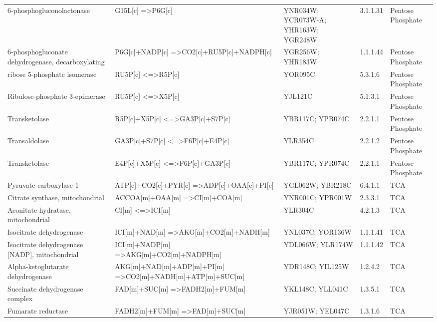 {\begin{landscape}
\begin{longtable}{p{.20\linewidth} | p{.25\linewidth} | p{.19\linewidth} | p{.05\linewidth} | p{.10\linewidth}}
6-phosphogluconolactonase & G15L{[}c{]} =\textgreater P6G{[}c{]}  & YNR034W; YCR073W-A; YHR163W; YGR248W  & 3.1.1.31 & Pentose Phosphate \\
6-phosphogluconate dehydrogenase, decarboxylating  & P6G{[}c{]}+NADP{[}c{]} =\textgreater CO2{[}c{]}+RU5P{[}c{]}+NADPH{[}c{]} & YGR256W; YHR183W & 1.1.1.44 & Pentose Phosphate \\
ribose 5-phosphate isomerase  & RU5P{[}c{]} \textless{}=\textgreater R5P{[}c{]} & YOR095C & 5.3.1.6  & Pentose Phosphate \\
Ribulose-phosphate 3-epimerase  & RU5P{[}c{]} \textless{}=\textgreater X5P{[}c{]} & YJL121C & 5.1.3.1  & Pentose Phosphate \\
Transketolase  & R5P{[}c{]}+X5P{[}c{]} \textless{}=\textgreater GA3P{[}c{]}+S7P{[}c{]}  & YBR117C; YPR074C & 2.2.1.1  & Pentose Phosphate \\
Transaldolase  & GA3P{[}c{]}+S7P{[}c{]} \textless{}=\textgreater F6P{[}c{]}+E4P{[}c{]}  & YLR354C & 2.2.1.2  & Pentose Phosphate \\
Transketolase  & E4P{[}c{]}+X5P{[}c{]} \textless{}=\textgreater F6P{[}c{]}+GA3P{[}c{]}  & YBR117C; YPR074C & 2.2.1.1  & Pentose Phosphate \\
Pyruvate carboxylase 1 & ATP{[}c{]}+CO2{[}c{]}+PYR{[}c{]} =\textgreater ADP{[}c{]}+OAA{[}c{]}+PI{[}c{]}  & YGL062W; YBR218C & 6.4.1.1  & TCA  \\
Citrate synthase, mitochondrial & ACCOA{[}m{]}+OAA{[}m{]} =\textgreater CI{[}m{]}+COA{[}m{]} & YNR001C; YPR001W & 2.3.3.1  & TCA  \\
Aconitate hydratase, mitochondrial  & CI{[}m{]} \textless{}=\textgreater ICI{[}m{]} & YLR304C & 4.2.1.3  & TCA  \\
Isocitrate dehydrogenase & ICI{[}m{]}+NAD{[}m{]} =\textgreater AKG{[}m{]}+CO2{[}m{]}+NADH{[}m{]}  & YNL037C; YOR136W & 1.1.1.41 & TCA  \\
Isocitrate dehydrogenase {[}NADP{]}, mitochondrial & ICI{[}m{]}+NADP{[}m{]} =\textgreater AKG{[}m{]}+CO2{[}m{]}+NADPH{[}m{]}  & YDL066W; YLR174W & 1.1.1.42 & TCA  \\
Alpha-ketoglutarate dehydrogenase & AKG{[}m{]}+NAD{[}m{]}+ADP{[}m{]}+PI{[}m{]} =\textgreater CO2{[}m{]}+NADH{[}m{]}+ATP{[}m{]}+SUC{[}m{]}  & YDR148C; YIL125W & 1.2.4.2  & TCA  \\
Succinate dehydrogenase complex & FAD{[}m{]}+SUC{[}m{]} =\textgreater FADH2{[}m{]}+FUM{[}m{]}  & YKL148C; YLL041C & 1.3.5.1  & TCA  \\
Fumarate reductase & FADH2{[}m{]}+FUM{[}m{]} =\textgreater FAD{[}m{]}+SUC{[}m{]}  & YJR051W; YEL047C & 1.3.1.6  & TCA  \\

\end{longtable}
\end{landscape}}

